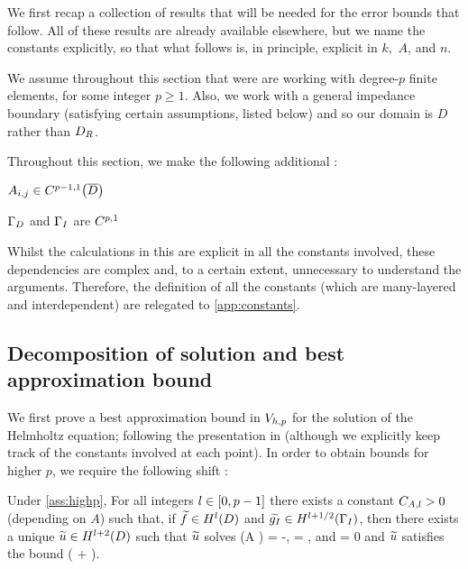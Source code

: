 We first recap a collection of results that will be needed for the error bounds that follow. All of these results are already available elsewhere, but we name the constants explicitly, so that what follows is, in principle, explicit in $k,$ $A$, and $n.$

We assume throughout this section that were are working with degree-$p$ finite elements, for some integer $p \geq 1.$ Also, we work with a general impedance boundary (satisfying certain assumptions, listed below) and so our domain is $D$ rather than $D_{R}$.

Throughout this section, we make the following additional :
\label{ass:highp}
\bit
\item $\Aij \in \CpmooDclos$
\item $\Gamma_{D}$ and $\Gamma_{I}$ are $C^{p,1}$
  \eit
\eas

Whilst the calculations in this  are explicit in all the constants involved, these dependencies are complex and, to a certain extent, unnecessary to understand the arguments. Therefore, the definition of all the constants (which are many-layered and interdependent) are relegated to \cref{app:constants}.

\subsection{Decomposition of solution and best approximation bound}

We first prove a best approximation bound in $V_{h,p}$ for the solution of the Helmholtz equation; following the presentation in \cite{ChNi:18a} (although we explicitly keep track of the constants involved at each point). In order to obtain bounds for higher $p$, we require the following shift :

\label{thm:shift}
Under \cref{ass:highp}, For all integers $l \in \mleft[0,p-1\mright]$ there exists a constant $C_{A,l}>0$ (depending on $A$) such that, if $\ftilde \in \HlD$ and $\gItilde \in \HlphGI$, then there exists a unique $\utilde \in \HlptD$ such that $\widetilde{u}$ solves
\beqs
\grad \cdot \mleft(A \grad \utilde\mright) = -\ftilde,
\eeqs
\beqs
\dn \utilde = \gItilde,
\eeqs
and
\beqs
\trD \utilde = 0
\eeqs
and $\widetilde{u}$ satisfies the bound
\beq\label{eq:shift}
\NHlptD{\utilde} \leq \CAl \mleft(\NHlD{\ftilde} + \NHlphGI{\gItilde}\mright).
\eeq
\enth

